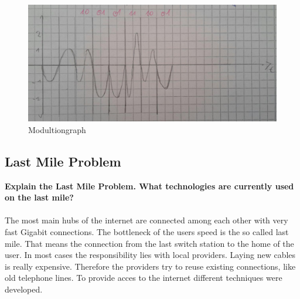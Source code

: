 \documentclass[a4paper,12pt]{article}
\begin{document}
    \begin{figure}[h!] 
        \includegraphics[width=1\linewidth]{mod_solution2.png} 
	    \caption{Modultiongraph}
    \end{figure}
	
	
	\subsection{Last Mile Problem}
	\textbf{Explain the Last Mile Problem. What technologies are currently used on the last mile?}\\
\\	
	The most main hubs of the internet are connected among each other with very fast Gigabit connections. The bottleneck of the users speed is the so called last mile. That means the connection from the last switch station to the home of the user. In most cases the responsibility lies with local providers. Laying new cables is really expensive. Therefore the providers try to reuse existing connections, like old telephone lines. To provide acces to the internet different techniques were developed.
	
\end{document}
